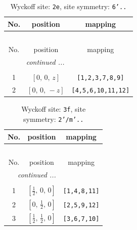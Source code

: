 \documentclass[fleqn,8pt]{jsarticle}
\begin{document}
\begin{longtable}{ccc}
\caption{Wyckoff site: {\tt 2e}, site symmetry: {\tt 6'..}}
 \\
 \hline \hline
No. & position & mapping \\ \hline \endfirsthead

\multicolumn{2}{l}{\tablename\ \thetable{}} \\
 \hline \hline
No. & position & mapping \\ \hline \endhead

 \hline \hline
\multicolumn{2}{r}{\footnotesize\it continued ...} \\ \endfoot

 \hline \hline
\multicolumn{2}{r}{} \\ \endlastfoot

1 & $\left[ 0,\, 0,\, z \right]$ & {\tt [1,2,3,7,8,9]} \\ \hline
2 & $\left[ 0,\, 0,\, - z \right]$ & {\tt [4,5,6,10,11,12]} \\
\end{longtable}
\renewcommand{\arraystretch}{1.2}
\begin{longtable}{ccc}
\caption{Wyckoff site: {\tt 3f}, site symmetry: {\tt 2'/m'..}}
 \\
 \hline \hline
No. & position & mapping \\ \hline \endfirsthead

\multicolumn{2}{l}{\tablename\ \thetable{}} \\
 \hline \hline
No. & position & mapping \\ \hline \endhead

 \hline \hline
\multicolumn{2}{r}{\footnotesize\it continued ...} \\ \endfoot

 \hline \hline
\multicolumn{2}{r}{} \\ \endlastfoot

1 & $\left[ \frac{1}{2},\, 0,\, 0 \right]$ & {\tt [1,4,8,11]} \\ \hline
2 & $\left[ 0,\, \frac{1}{2},\, 0 \right]$ & {\tt [2,5,9,12]} \\ \hline
3 & $\left[ \frac{1}{2},\, \frac{1}{2},\, 0 \right]$ & {\tt [3,6,7,10]} \\
\end{longtable}
\renewcommand{\arraystretch}{1.2}
\end{document}
